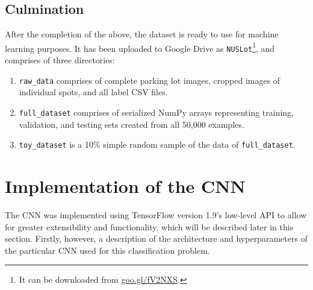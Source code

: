 \documentclass[a4paper, 11pt]{article} %
\begin{document}
	\subsection{Culmination}
		After the completion of the above, the dataset is ready to use for 
		machine learning purposes. It
		has been uploaded to Google Drive as \texttt{NUSLot}\footnote{It can be 
		downloaded from \hyperlink{https://goo.gl/fV2NXS}{goo.gl/fV2NXS}.}, and 
		comprises of 
		three directories:
		\begin{enumerate}
			\item \texttt{raw\_data} comprises of complete parking lot 
			images, cropped images of individual spots, and all label CSV files.
			\item \texttt{full\_dataset} comprises of serialized NumPy arrays 
			representing
			training, validation, and testing sets created from all 50,000 examples. 
			\item \texttt{toy\_dataset} is a 10\% simple random sample of the 
			data of
			\texttt{full\_dataset}.
		\end{enumerate}

\section{Implementation of the CNN}
	The CNN was implemented using TensorFlow version 1.9's low-level API to
	allow for greater extensibility and functionality, which will be described 
	later in this section. Firstly, however, a description of the architecture 
	and 
	hyperparameters of the particular CNN used for this classification problem.
\end{document}
